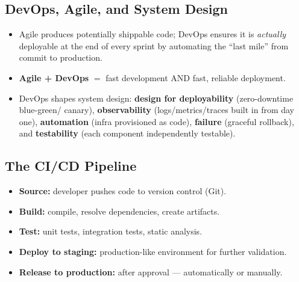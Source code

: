 \documentclass[hidelinks]{article}
\begin{document}
\subsection{DevOps, Agile, and System Design}
\begin{itemize}
  \item Agile produces potentially shippable code; DevOps ensures it is \emph{actually} deployable
        at the end of every sprint by automating the ``last mile'' from commit to production.
  \item \textbf{Agile + DevOps} $=$ fast development AND fast, reliable deployment.
  \item DevOps shapes system design: \textbf{design for deployability} (zero-downtime blue-green/
        canary), \textbf{observability} (logs/metrics/traces built in from day one), \textbf{automation}
        (infra provisioned as code), \textbf{failure} (graceful rollback), and \textbf{testability}
        (each component independently testable).
\end{itemize}

\subsection{The CI/CD Pipeline}
\begin{itemize}
  \item \textbf{Source:} developer pushes code to version control (Git).
  \item \textbf{Build:} compile, resolve dependencies, create artifacts.
  \item \textbf{Test:} unit tests, integration tests, static analysis.
  \item \textbf{Deploy to staging:} production-like environment for further validation.
  \item \textbf{Release to production:} after approval --- automatically or manually.
\end{itemize}
\end{document}
